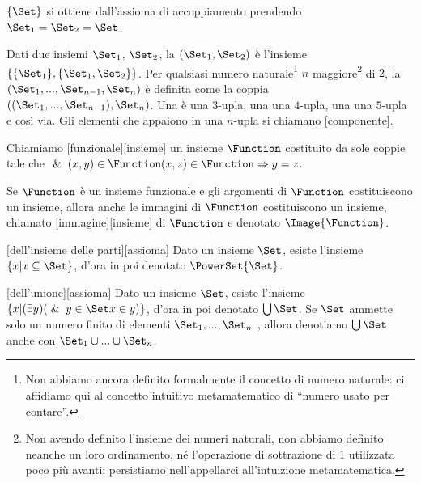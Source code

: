 \Proof $\lbrace \Set \rbrace$ si ottiene dall'assioma di accoppiamento prendendo $\Set_1 = \Set_2 = \Set$. \EndProof
\begin{Definition}
	Dati due insiemi $\Set_1$, $\Set_2$, la  $(\Set_1,\Set_2)$ \`e l'insieme $\lbrace \lbrace \Set_1 \rbrace, \lbrace \Set_1, \Set_2 \rbrace \rbrace$. Per qualsiasi numero naturale\footnote{Non abbiamo ancora definito formalmente il concetto di numero naturale: ci affidiamo qui al concetto intuitivo metamatematico di ``numero usato per contare''.} $n$ maggiore\footnote{Non avendo definito l'insieme dei numeri naturali, non abbiamo definito neanche un loro ordinamento, n\'e l'operazione di sottrazione di $1$ utilizzata poco pi\`u avanti: persistiamo nell'appellarci all'intuizione metamatematica.} di $2$, la  $(\Set_1, ..., \Set_{n - 1}, \Set_n)$ \`e definita come la coppia $((\Set_1, ..., \Set_{n - 1}), \Set_n)$. Una  \`e una $3$-upla, una  una $4$-upla, una  una $5$-upla e cos\`i via. Gli elementi che appaiono in una $n$-upla si chiamano [componente].
\end{Definition}
\begin{Definition}
	Chiamiamo [funzionale][insieme] un insieme $\Function$ costituito da sole coppie tale che $\And{(x,y) \in \Function}{(x,z) \in \Function} \Rightarrow y = z$.
\end{Definition}
\begin{Axiom}
	 Se $\Function$ \`e un insieme funzionale e gli argomenti di $\Function$ costituiscono un insieme, allora anche le immagini di $\Function$ costituiscono un insieme, chiamato [immagine][insieme] di $\Function$ e denotato $\Image{\Function}$.
\end{Axiom}
\begin{Axiom}
	[dell'insieme delle parti][assioma] Dato un insieme $\Set$, esiste l'insieme $\lbrace x | x \subseteq \Set \rbrace$, d'ora in poi denotato $\PowerSet{\Set}$.
\end{Axiom}
\begin{Axiom}
	[dell'unione][assioma] Dato un insieme $\Set$, esiste l'insieme $\lbrace x | (\exists y)(\And{y \in \Set}{x \in y}) \rbrace$, d'ora in poi denotato $\bigcup \Set$. Se $\Set$ ammette solo un numero finito di elementi $\Set_1, ..., \Set_n$ , allora denotiamo $\bigcup \Set$ anche con $\Set_1 \cup ... \cup \Set_n$.
\end{Axiom}
